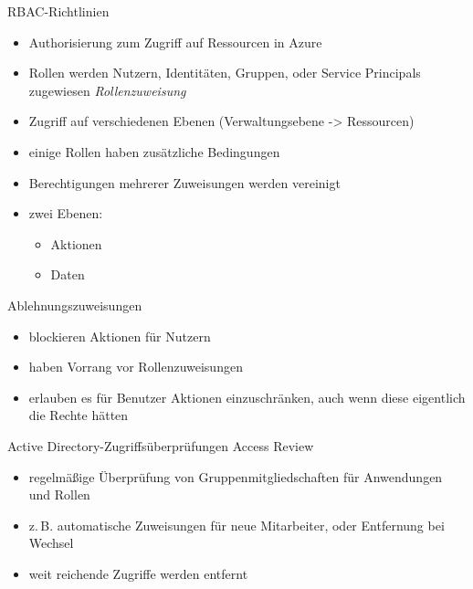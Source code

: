 \begin{flashcard}[Definition]{RBAC-Richtlinien}
  \begin{itemize}
    \item Authorisierung zum Zugriff auf Ressourcen in Azure
    \item Rollen werden Nutzern, Identitäten, Gruppen, oder Service Principals zugewiesen\newline
      \emph{Rollenzuweisung}
    \item Zugriff auf verschiedenen Ebenen (Verwaltungsebene -> Ressourcen)
    \item einige Rollen haben zusätzliche Bedingungen
    \item Berechtigungen mehrerer Zuweisungen werden vereinigt
    \item zwei Ebenen:
      \begin{itemize}
        \item Aktionen
        \item Daten
      \end{itemize}
  \end{itemize}
\end{flashcard}

\begin{flashcard}[Definition]{Ablehnungszuweisungen}
  \begin{itemize}
    \item blockieren Aktionen für Nutzern
    \item haben Vorrang vor Rollenzuweisungen
    \item erlauben es für Benutzer Aktionen einzuschränken,\newline
      auch wenn diese eigentlich die Rechte hätten
  \end{itemize}
\end{flashcard}

\begin{flashcard}[Definition]{Active Directory-Zugriffsüberprüfungen}
  Access Review
  \begin{itemize}
    \item regelmäßige Überprüfung von Gruppenmitgliedschaften für Anwendungen und Rollen
    \item z.\,B. automatische Zuweisungen für neue Mitarbeiter, oder Entfernung bei Wechsel
    \item weit reichende Zugriffe werden entfernt
  \end{itemize}
\end{flashcard}

